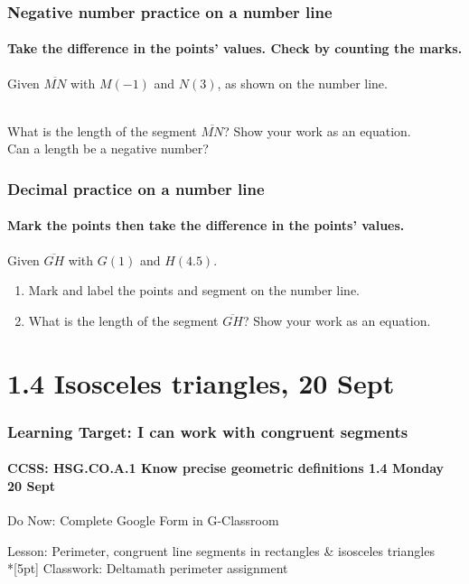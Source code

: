\documentclass{beamer}
\begin{document}
  \frame
  {
    \frametitle{Negative number practice on a number line}
    \framesubtitle{Take the difference in the points' values. Check by counting the marks.}
    Given $\overline{MN}$ with $M(-1)$ and $N(3)$, as shown on the number line. \\[0.25cm]
       \\ \bigskip
  What is the length of the segment $\overline{MN}$? Show your work as an equation.\\[1.5cm]
  Can a length be a negative number? \vspace{2cm}  
  }

  \frame
  {
    \frametitle{Decimal practice on a number line}
    \framesubtitle{Mark the points then take the difference in the points' values.}
    Given $\overline{GH}$ with $G(1)$ and $H(4.5)$. \\[1.5cm]
      \begin{enumerate}
        \item Mark and label the points and segment on the number line.
        \item What is the length of the segment $\overline{GH}$? Show your work as an equation.
      \end{enumerate} \vspace{2cm}  
  }

  \section{1.4 Isosceles triangles, 20 Sept}
  \frame
  {
    \frametitle{Learning Target: I can work with congruent segments}
    \framesubtitle{CCSS: HSG.CO.A.1 Know precise geometric definitions  \hfill \alert{1.4 Monday 20 Sept}}
  
    \begin{block}{Do Now: Complete Google Form in G-Classroom}
    \end{block}
    Lesson: Perimeter, congruent line segments in rectangles \& isosceles triangles \\*[5pt]
    Classwork: Deltamath perimeter assignment
  }
\end{document}
